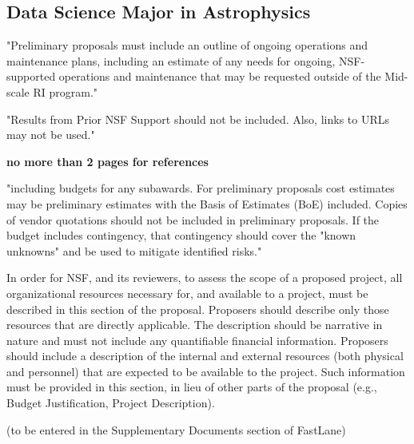 \documentclass[oneside,11pt]{amsart}
\newcommand{\comment}[2][todo]{{\color{#1}[[{\bf #2}]]}}
\begin{document}
\subsection{Data Science Major in Astrophysics}
\noindent \comment{1/4 page}


"Preliminary proposals must include an outline of ongoing operations and
maintenance plans, including an estimate of any needs for ongoing,
NSF-supported operations and maintenance that may be requested outside
of the Mid-scale RI program."

"Results from Prior NSF Support should not be included. Also, links to
URLs may not be used."

\vspace{-0.5cm}

{\bf no more than 2 pages for references}

\clearpage




\newpage


"including budgets for any subawards. For preliminary proposals cost
estimates may be preliminary estimates with the Basis of Estimates (BoE)
included. Copies of vendor quotations should not be included in
preliminary proposals. If the budget includes contingency, that
contingency should cover the "known unknowns" and be used to mitigate
identified risks."

\newpage


In order for NSF, and its reviewers, to assess the scope of a proposed
project, all organizational resources necessary for, and available to a
project, must be described in this section of the proposal. Proposers
should describe only those resources that are directly applicable. The
description should be narrative in nature and must not include any
quantifiable financial information. Proposers should include a
description of the internal and external resources (both physical and
personnel) that are expected to be available to the project.  Such
information must be provided in this section, in lieu of other parts of
the proposal (e.g., Budget Justification, Project Description).

\newpage


(to be entered in the Supplementary Documents section of FastLane)
\end{document}
